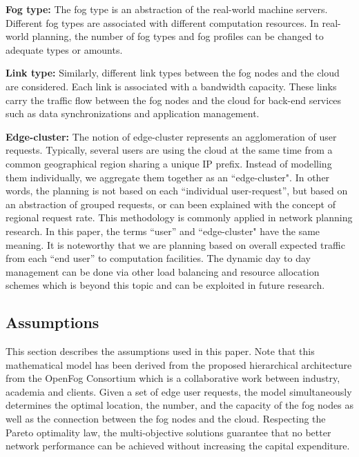 \documentclass[10pt,journal,compsoc]{IEEEtran}
\begin{document}
\textbf{Fog type: }The fog type is an abstraction of the real-world machine servers. Different fog types are associated with different computation resources. In real-world planning, the number of fog types and fog profiles can be changed to adequate types or amounts.

\textbf{Link type: }Similarly, different link types between the fog nodes and the cloud are considered. Each link is associated with a bandwidth capacity. These links carry the traffic flow between the fog nodes and the cloud for back-end services such as data synchronizations and application management.

\textbf{Edge-cluster: }The notion of edge-cluster represents an agglomeration of user requests. Typically, several users are using the cloud at the same time from a common geographical region sharing a unique IP prefix. Instead of modelling them individually, we aggregate them together as an ``edge-cluster". In other words, the planning is not based on each “individual user-request”, but based on an abstraction of grouped requests, or can been explained with the concept of regional request rate. This methodology is commonly applied in network planning research\cite{zhang2010cloud,wang2017computation,pahlavan2011principles}. In this paper, the terms ``user'' and ``edge-cluster" have the same meaning.
It is noteworthy that we are planning based on overall expected traffic from each ``end user'' to computation facilities. The dynamic day to day management can be done via other load balancing and resource allocation schemes which is beyond this topic and can be exploited in future research.



\subsection{Assumptions}\label{assumption}
This section describes the assumptions used in this paper. Note that this mathematical model has been derived from the proposed hierarchical architecture from the OpenFog Consortium which is a collaborative work between industry, academia and clients. Given a set of edge user requests, the model simultaneously determines the optimal location, the number, and the capacity of the fog nodes as well as the connection between the fog nodes and the cloud. Respecting the Pareto optimality law, the multi-objective solutions guarantee that no better network performance can be achieved without increasing the capital expenditure.
\end{document}
